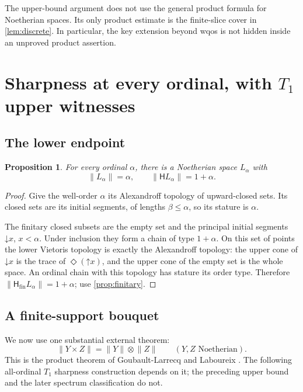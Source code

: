 \documentclass[11pt,a4paper]{article}
\newtheorem{proposition}[proposition]{Proposition}
\theoremstyle{definition}
\newcommand{\HH}{\mathsf H}
\newcommand{\Hfin}{\mathsf H_{\mathrm{fin}}}
\newcommand{\st}[1]{\lVert #1\rVert}
\numberwithin{equation}{section}
\begin{document}
The upper-bound argument does not use the general product formula for
Noetherian spaces.  Its only product estimate is the finite-slice cover
in \cref{lem:discrete}.  In particular, the key extension beyond wqos is
not hidden inside an unproved product assertion.

\section{Sharpness at every ordinal, with \texorpdfstring{$T_1$}{T1} upper witnesses}
\label{sec:sharp}

\subsection{The lower endpoint}

\begin{proposition}\label{prop:lowerSharp}
For every ordinal $\alpha$, there is a Noetherian space $L_\alpha$ with
\[
 \st{L_\alpha}=\alpha,
 \qquad \st{\HH L_\alpha}=1+\alpha.
\]
\end{proposition}
\begin{proof}
Give the well-order $\alpha$ its Alexandroff topology of upward-closed
sets.  Its closed sets are its initial segments, of lengths
$\beta\leq\alpha$, so its stature is $\alpha$.

The finitary closed subsets are the empty set and the principal initial
segments $\mathord\downarrow x$, $x<\alpha$.  Under inclusion they form
a chain of type $1+\alpha$.  On this set of points the lower Vietoris
topology is exactly the Alexandroff topology: the upper cone of
$\mathord\downarrow x$ is the trace of $\Diamond(\mathord\uparrow x)$,
and the upper cone of the empty set is the whole space.  An ordinal
chain with this topology has stature its order type.  Therefore
$\st{\Hfin L_\alpha}=1+\alpha$; use \cref{prop:finitary}.
\end{proof}

\subsection{A finite-support bouquet}

We now use one substantial external theorem:
\begin{equation}\label{eq:productexternal}
 \st{Y\times Z}=\st Y\otimes\st Z
 \qquad (Y,Z\text{ Noetherian}).
\end{equation}
This is the product theorem of Goubault-Larrecq and Laboureix
\cite[Theorem~10.9]{GL23}.  The following all-ordinal $T_1$ sharpness
construction depends on it; the preceding upper bound and the later
spectrum classification do not.
\end{document}
